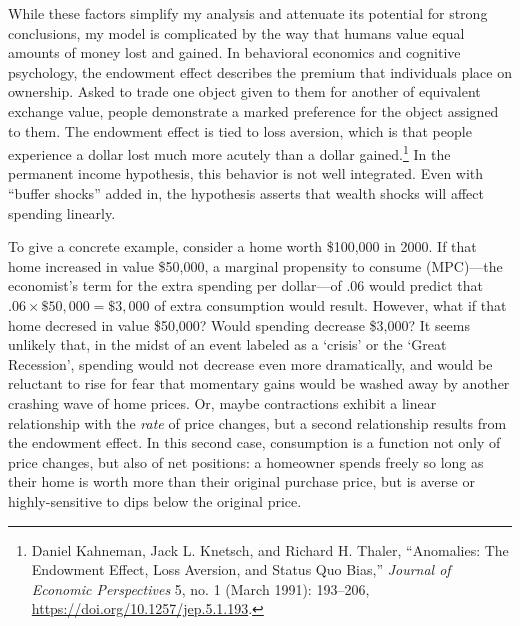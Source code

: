 \documentclass[12pt,oneside]{psthesis}
\begin{document}
While these factors simplify my analysis and attenuate its potential for strong conclusions, my model is complicated by the way that humans value equal amounts of money lost and gained.
In behavioral economics and cognitive psychology, the endowment effect describes the premium that individuals place on ownership.
Asked to trade one object given to them for another of equivalent exchange value, people demonstrate a marked preference for the object assigned to them.
The endowment effect is tied to loss aversion, which is that people experience a dollar lost much more acutely than a dollar gained.\footnote{Daniel Kahneman, Jack L. Knetsch, and Richard H. Thaler, ``Anomalies: The Endowment Effect, Loss Aversion, and Status Quo Bias,'' \emph{Journal of Economic Perspectives} 5, no. 1 (March 1991): 193--206, \url{https://doi.org/10.1257/jep.5.1.193}.}
In the permanent income hypothesis, this behavior is not well integrated.
Even with ``buffer shocks'' added in, the hypothesis asserts that wealth shocks will affect spending linearly.

To give a concrete example, consider a home worth \$100,000 in 2000.
If that home increased in value \$50,000, a marginal propensity to consume (MPC)---the economist's term for the extra spending per dollar---of .06 would predict that \(.06 \times \$50,000 = \$3,000\) of extra consumption would result.
However, what if that home decresed in value \$50,000?
Would spending decrease \$3,000?
It seems unlikely that, in the midst of an event labeled as a `crisis' or the `Great Recession', spending would not decrease even more dramatically, and would be reluctant to rise for fear that momentary gains would be washed away by another crashing wave of home prices.
Or, maybe contractions exhibit a linear relationship with the \emph{rate} of price changes, but a second relationship results from the endowment effect.
In this second case, consumption is a function not only of price changes, but also of net positions: a homeowner spends freely so long as their home is worth more than their original purchase price, but is averse or highly-sensitive to dips below the original price.
\end{document}
